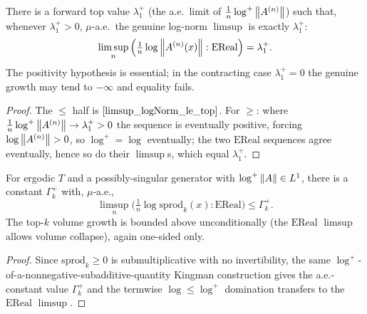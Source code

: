 \begin{theorem}\label{limsup_logNorm_eq_top_of_pos}
  \leanok
  There is a forward top value $\lambda_1^+$ (the a.e.\ limit of $\tfrac1n\log^+\left\lVert A^{(n)} \right\rVert$) such that, whenever $\lambda_1^+ > 0$, $\mu$-a.e.\ the genuine log-norm $\limsup$ is exactly $\lambda_1^+$:
  \[ \limsup_n\Big(\tfrac1n\log\left\lVert A^{(n)}(x) \right\rVert : \mathrm{EReal}\Big) = \lambda_1^+. \]
  The positivity hypothesis is essential; in the contracting case $\lambda_1^+ = 0$ the genuine growth may tend to $-\infty$ and equality fails.
\end{theorem}
\begin{proof}\leanok
  The $\le$ half is $\ref{limsup_logNorm_le_top}$. For $\ge$: where $\tfrac1n\log^+\left\lVert A^{(n)} \right\rVert \to \lambda_1^+ > 0$ the sequence is eventually positive, forcing $\log\left\lVert A^{(n)} \right\rVert > 0$, so $\log^+ = \log$ eventually; the two $\mathrm{EReal}$ sequences agree eventually, hence so do their $\limsup$s, which equal $\lambda_1^+$.
\end{proof}

\begin{theorem}\label{limsup_logSprod_le_top}
  \leanok
  For ergodic $T$ and a possibly-singular generator with $\log^+\left\lVert A \right\rVert \in L^1$, there is a constant $\Gamma_k^+$ with, $\mu$-a.e.,
  \[ \limsup_n\Big(\tfrac1n\log\mathrm{sprod}_k(x) : \mathrm{EReal}\Big) \le \Gamma_k^+. \]
  The top-$k$ volume growth is bounded above unconditionally (the $\mathrm{EReal}$ $\limsup$ allows volume collapse), again one-sided only.
\end{theorem}
\begin{proof}\leanok
  Since $\mathrm{sprod}_k \ge 0$ is submultiplicative with no invertibility, the same $\log^+$-of-a-nonnegative-subadditive-quantity Kingman construction gives the a.e.-constant value $\Gamma_k^+$ and the termwise $\log \le \log^+$ domination transfers to the $\mathrm{EReal}$ $\limsup$.
\end{proof}
